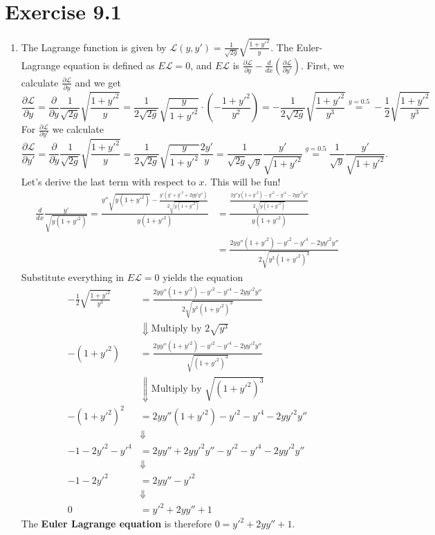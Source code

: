 \documentclass[a4paper]{article}
\theoremstyle{plain}
\begin{document}
\section*{Exercise 9.1}
\begin{enumerate}[label=(\alph*)]
	\item The Lagrange function is given by $\mathcal L(y,y') = \frac{1}{\sqrt{2g}}\sqrt{\frac{1+y'^2}{y}}$. The Euler-Lagrange equation is defined as $E\mathcal L = 0$, and $E\mathcal L$ is $\frac{\partial \mathcal L}{\partial y} - \frac{d}{dx}\left( \frac{\partial \mathcal L}{\partial y'} \right)$. First, we calculate $\frac{\partial \mathcal L}{\partial y}$ and we get
	\[
		\frac{\partial \mathcal L}{\partial y} = \frac{\partial}{\partial y}\frac{1}{\sqrt{2g}}\sqrt{\frac{1+y'^2}{y}} = \frac{1}{2\sqrt{2g}}\sqrt{\frac{y}{1+y'^2}} \cdot \left(-\frac{1+y'^2}{y^2}\right) 
		= -\frac{1}{2\sqrt{2g}} \sqrt{\frac{1+y'^2}{y^3}} \overset{g=0.5}{=}-\frac{1}{2} \sqrt{\frac{1+y'^2}{y^3}}
	\]
	For $\frac{\partial \mathcal L}{\partial y'}$ we calculate
	\[
		\frac{\partial \mathcal L}{\partial y'} = \frac{\partial}{\partial \dot y}\frac{1}{\sqrt{2g}}\sqrt{\frac{1+y'^2}{y}} = \frac{1}{2\sqrt{2g}}\sqrt{\frac{y}{1+y'^2}}\frac{2y'}{y} = \frac{1}{\sqrt{2g} \sqrt y} \frac{y'}{\sqrt{1+y'^2}} \overset{g=0.5}{=} \frac{1}{\sqrt y} \frac{y'}{\sqrt{1+y'^2}}.
	\]
	Let's derive the last term with respect to $x$. This will be fun!
	\begin{align*}
		\frac{d}{dx}\frac{y'}{\sqrt{y(1+y'^2)}} = \frac{y''\sqrt{y(1+y'^2)} - \frac{y'(y' + y'^3 + 2yy'y'')}{2\sqrt{y(1+y'^2)}}}{y(1+y'^2)} &= \frac{\frac{2y''y(1+y'^2) - y'^2 - y'^4 - 2yy'^2y''}{2\sqrt{y(1+y'^2)}}}{y(1+y'^2)} \\
		&= \frac{2yy''(1+y'^2) - y'^2 - y'^4 - 2yy'^2y''}{2\sqrt{y^3(1+y'^2)^3}}
	\end{align*}
	Substitute everything in $E\mathcal L = 0$ yields the equation
	\begin{align*}
		-\frac{1}{2} \sqrt{\frac{1+y'^2}{y^3}} &= \frac{2yy''(1+y'^2) - y'^2 - y'^4 - 2yy'^2y''}{2\sqrt{y^3(1+y'^2)^3}} \\
		&\Downarrow \text{Multiply by $2\sqrt{y^3}$}\\
		-(1+y'^2) &= \frac{2yy''(1+y'^2) - y'^2 - y'^4 - 2yy'^2y''}{\sqrt{(1+y'^2)^3}} \\
		&\Downarrow \text{Multiply by $\sqrt{(1+y'^2)^3}$}\\
		-(1+y'^2)^2 &= 2yy''(1+y'^2) - y'^2 - y'^4 - 2yy'^2y'' \\
		&\Downarrow \\
		-1-2y'^2-y'^4 &= 2yy'' + 2yy'^2y'' - y'^2 - y'^4 - 2yy'^2y'' \\
		&\Downarrow \\
		-1-2y'^2 &= 2yy'' - y'^2  \\
		&\Downarrow \\
		0 &= y'^2 + 2yy'' + 1
	\end{align*}
	The \textbf{Euler Lagrange equation} is therefore $0 = y'^2 + 2yy'' + 1$.
	

\end{enumerate}
\end{document}
